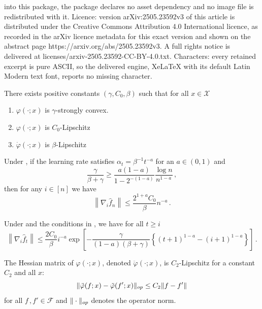 \documentclass[10pt,a4paper]{amsart}
\newcommand{\X}{{\mathcal{X}}}
\begin{document}
into this package, the package declares no asset dependency and no image file is redistributed with it. Licence: version arXiv:2505.23592v3 of this article is distributed under the Creative Commons Attribution 4.0 International licence, as recorded in the arXiv licence metadata for this exact version and shown on the abstract page https://arxiv.org/abs/2505.23592v3. A full rights notice is delivered at licenses/arxiv-2505.23592-CC-BY-4.0.txt. Characters: every retained excerpt is pure ASCII, so the delivered engine, XeLaTeX with its default Latin Modern text font, reports no missing character.
\begin{assumption}
    \label{asm:6.1-smooth_convex}
    There exists positive constants $(\gamma, C_0, \beta)$ such that for all $x\in\X$
    \begin{enumerate}
        \item [(a)] $\varphi(\cdot;x)$ is $\gamma$-strongly convex.
        \item [(b)] $\varphi(\cdot;x)$ is $C_0$-Lipschitz
        \item [(c)] $\dot\varphi(\cdot;x)$ is $\beta$-Lipschitz        \end{enumerate}
\end{assumption}

\begin{theorem}\label{thm:6.1-first-order-stab-sgd}
    Under , if the learning rate satisfies $\alpha_t=\beta^{-1}t^{-a}$ for an $a\in(0,1)$ and
    $$\frac{\gamma}{\beta+\gamma}\ge \frac{a(1-a)}{1-2^{-(1-a)}}\frac{\log n}{n^{1-a}}\,,$$
    then for any $i\in [n]$ we have $$\left\|\nabla_i \hat f_n\right\|\le \frac{2^{1+a}C_0}{\beta}n^{-a}\,.$$
\end{theorem}

\begin{lemma}\label{lem:6.1-first-order-error}
Under  and the conditions in , we have for all $t\ge i$
$$
\left\|\nabla_i\hat f_t\right\|\le\frac{2C_0}{\beta}i^{-a}\exp\left[-\frac{\gamma}{(1-a)(\beta+\gamma)}\left\{(t+1)^{1-a}-(i+1)^{1-a}\right\}\right]\,.
$$
\end{lemma}

\begin{assumption}\label{asm:6.2-smooth-hessian}
 The Hessian matrix of $\varphi(\cdot;x)$, denoted $\ddot\varphi(\cdot;x)$, is $C_2$-Lipschitz for a constant $C_2$ and all $x$:
 $$
 \|\ddot\varphi(f;x)-\ddot\varphi(f';x)\|_{\rm op}\le C_2\|f-f'\|
 $$
 for all $f\,,f'\in \mathcal F$ and $\|\cdot\|_{\rm op}$ denotes the operator norm.
\end{assumption}
\end{document}
